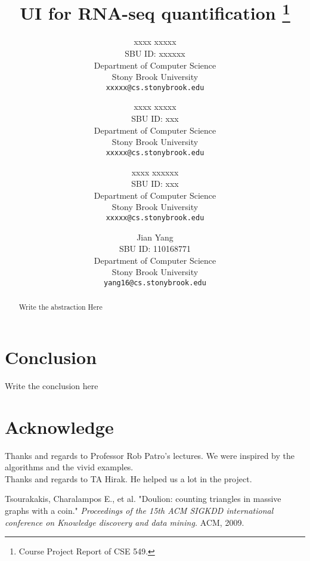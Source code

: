 \documentclass[11pt,letter]{article}
\title{UI for RNA-seq quantification \footnote{Course Project Report of CSE 549.}}
\author{
xxxx xxxxx\\
       {\small SBU ID: xxxxxx}\\
       {\small Department of Computer Science}\\
       {\small Stony Brook University} \\
       {\small \texttt{xxxxx@cs.stonybrook.edu}}
\and
xxxx xxxxx \\
       {\small SBU ID: xxx}\\
       {\small Department of Computer Science}\\
       {\small Stony Brook University} \\
       {\small \texttt{xxxxx@cs.stonybrook.edu}}
\and
xxxx xxxxxx \\
       {\small SBU ID: xxx}\\
       {\small Department of Computer Science}\\
       {\small Stony Brook University} \\
       {\small \texttt{xxxxx@cs.stonybrook.edu}}
\and
Jian Yang \\
       {\small SBU ID: 110168771}\\
       {\small Department of Computer Science}\\
       {\small Stony Brook University}\\
       {\small \texttt{yang16@cs.stonybrook.edu}}
}
\date{}
\begin{document}
\maketitle

\begin{abstract}
Write the abstraction Here
\end{abstract}

\thispagestyle{empty}
\newpage
\addtocounter{page}{-1}


\newpage

\newpage
% 
% 
% 
% 
\section{Conclusion}
Write the conclusion here

\section{Acknowledge}
Thanks and regards to Professor Rob Patro's lectures. We were inspired by the algorithms and the vivid examples. \\
Thanks and regards to TA Hirak. He helped us a lot in the project.

% 


\begin{thebibliography}{100} %
 Tsourakakis, Charalampos E., et al. "Doulion: counting triangles in massive graphs with a coin." \emph{Proceedings of the 15th ACM SIGKDD international conference on Knowledge discovery and data mining.} ACM, 2009.
\end{thebibliography}

% 
\end{document}
